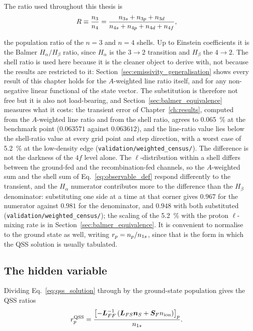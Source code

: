 The ratio used throughout this thesis is
\begin{equation}
  R \equiv \frac{n_3}{n_4}
  = \frac{n_{3s}+n_{3p}+n_{3d}}{n_{4s}+n_{4p}+n_{4d}+n_{4f}},
  \label{eq:observable_def}
\end{equation}

\noindent the population ratio of the $n=3$ and $n=4$ shells. Up to Einstein
coefficients it is the Balmer $H_\alpha/H_\beta$ ratio, since $H_\alpha$ is the
$3\to2$ transition and $H_\beta$ the $4\to2$. The shell ratio is used here
because it is the cleaner object to derive with, not because the results are
restricted to it: Section~\ref{sec:emissivity_generalisation} shows every result
of this chapter holds for the $A$-weighted line ratio itself, and for any
non-negative linear functional of the state vector. The substitution is
therefore not free but it is also not load-bearing, and
Section~\ref{sec:balmer_equivalence} measures what it costs: the transient error
of Chapter~\ref{ch:results}, computed from the $A$-weighted line ratio and from
the shell ratio, agrees to \SI{0.065}{\percent} at the benchmark point
($0.063571$ against $0.063612$), and the line-ratio value lies below the
shell-ratio value at every grid point and step direction, with a worst case of
\SI{5.2}{\percent} at the low-density edge
(\texttt{validation/weighted\_census/}). The difference is not the darkness of
the $4f$ level alone. The $\ell$-distribution within a shell differs between
the ground-fed and the recombination-fed channels, so the $A$-weighted sum and
the shell sum of Eq.~\eqref{eq:observable_def} respond differently to the
transient, and the $H_\alpha$ numerator contributes more to the difference than
the $H_\beta$ denominator: substituting one side at a time at that corner gives
$0.967$ for the numerator against $0.981$ for the denominator, and $0.948$
with both substituted (\texttt{validation/weighted\_census/}); the scaling of
the \SI{5.2}{\percent} with the proton $\ell$-mixing rate is in
Section~\ref{sec:balmer_equivalence}. It is convenient to normalise to the
ground state as well, writing $r_p = n_p/n_{1s}$, since that is the form in which
the QSS solution is usually tabulated.

\subsection{The hidden variable}

Dividing Eq.~\eqref{eq:qss_solution} through by the ground-state population
gives the QSS ratios
\begin{equation}
  r_p^{\mathrm{QSS}}
  = \frac{\left[-\bm{L}_{FF}^{-1}\left(\bm{L}_{FS}\bm{n}_{S} + \bm{S}_Fn_{\mathrm{ion}}\right)\right]_p}
         {n_{1s}}.
  \label{eq:qss_ratio}
\end{equation}

